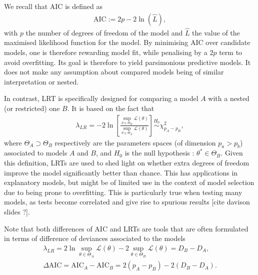 \documentclass[a4paper, 12pt,oneside]{article}
\begin{document}
				We recall that AIC is defined as 
				\begin{gather}
					\text{AIC}:=2p-2\ln(\hat L),
				\end{gather}
				with $p$ the number of degrees of freedom of the model and $\hat L$ the value of the maximised likelihood function for the model. By minimising AIC over candidate models, one is therefore rewarding model fit, while penalising by a $2p$ term to avoid overfitting. Its goal is therefore to yield parsimonious predictive models. It does not make any assumption about compared models being of similar interpretation or nested. 

				In contrast, LRT is specifically designed for comparing a model $A$ with a nested (or restricted) one $B$. It is based on the fact that 
				\begin{gather}
					\lambda_{LR}=-2\ln\left[\frac{\sup_{\theta\in\Theta_B}\mathcal{L(\theta)}}{\sup_{\theta\in\Theta_A}\mathcal{L(\theta)}}\right]
					\overset{H_0}{\sim} \chi^2_{p_A-p_B},
				\end{gather}
				where $\Theta_A\supset\Theta_B$ respectively are the parameters spaces (of dimension $p_a>p_b$) associated to models $A$ and $B$, and $H_0$ is the null hypothesis : $\theta^*\in\Theta_B$. Given this definition, LRTs are used to shed light on whether extra degrees of freedom improve the model significantly better than chance. This has applications in explanatory models, but might be of limited use in the context of model selection due to being prone to overfitting. This is particularly true when testing many models, as tests become correlated and give rise to spurious results [cite davison slides ?].

				Note that both differences of AIC and LRTs are tools that are often formulated in terms of difference of deviances associated to the models
				\begin{gather}
					\lambda_{LR} = 2\ln \sup_{\theta\in\Theta_A}\mathcal{L(\theta)} - 2 \sup_{\theta\in\Theta_B}\mathcal{L(\theta)} = D_B-D_A,\\
					\Delta \text{AIC} = \text{AIC}_A - \text{AIC}_B = 2(p_A-p_B) - 2(D_B-D_A). 
				\end{gather}
\end{document}
